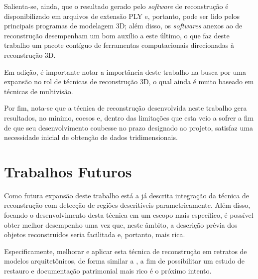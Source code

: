 			Salienta-se, ainda, que o resultado gerado pelo \textit{software} de reconstrução é disponibilizado em arquivos de extensão PLY e, portanto, pode ser lido pelos principais programas de modelagem 3D; além disso, os \textit{softwares} anexos ao de reconstrução desempenham um bom auxílio a este último, o que faz deste trabalho um pacote contíguo de ferramentas computacionais direcionadas à reconstrução 3D.
			
			Em adição, é importante notar a importância deste trabalho na busca por uma expansão no rol de técnicas de reconstrução 3D, o qual ainda é muito baseado em técnicas de multivisão. 
			
			Por fim, nota-se que a técnica de reconstrução desenvolvida neste trabalho gera resultados, no mínimo, coesos e, dentro das limitações que esta veio a sofrer a fim de que seu desenvolvimento coubesse no prazo designado ao projeto, satisfaz uma necessidade inicial de obtenção de dados tridimensionais.
			
		\section{Trabalhos Futuros}
			\label{secaoTrabalhosFuturos}
			
			Como futura expansão deste trabalho está a já descrita integração da técnica de reconstrução com detecção de regiões descritíveis parametricamente. Além disso, focando o desenvolvimento desta técnica em um escopo mais específico, é possível obter melhor desempenho uma vez que, neste âmbito, a descrição prévia dos objetos reconstruídos seria facilitada e, portanto, mais rica.
			
			Especificamente, melhorar e aplicar esta técnica de reconstrução em retratos de modelos arquitetônicos, de forma similar a \cite{3DFromLineDrawings}, a fim de possibilitar um estudo de restauro e documentação patrimonial mais rico é o próximo intento.